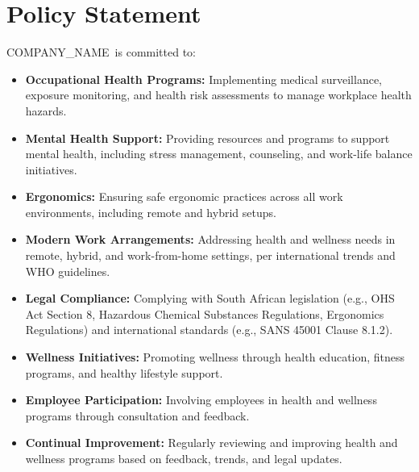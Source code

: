 \documentclass[11pt]{article}
\newcommand{\clientName}{{{COMPANY_NAME}}}
\begin{document}
\section{Policy Statement}
\clientName\ is committed to:
\begin{itemize}
    \item \textbf{Occupational Health Programs:} Implementing medical surveillance, exposure monitoring, and health risk assessments to manage workplace health hazards.
    \item \textbf{Mental Health Support:} Providing resources and programs to support mental health, including stress management, counseling, and work-life balance initiatives.
    \item \textbf{Ergonomics:} Ensuring safe ergonomic practices across all work environments, including remote and hybrid setups.
    \item \textbf{Modern Work Arrangements:} Addressing health and wellness needs in remote, hybrid, and work-from-home settings, per international trends and WHO guidelines.
    \item \textbf{Legal Compliance:} Complying with South African legislation (e.g., OHS Act Section 8, Hazardous Chemical Substances Regulations, Ergonomics Regulations) and international standards (e.g., SANS 45001 Clause 8.1.2).
    \item \textbf{Wellness Initiatives:} Promoting wellness through health education, fitness programs, and healthy lifestyle support.
    \item \textbf{Employee Participation:} Involving employees in health and wellness programs through consultation and feedback.
    \item \textbf{Continual Improvement:} Regularly reviewing and improving health and wellness programs based on feedback, trends, and legal updates.
\end{itemize}
\end{document}
